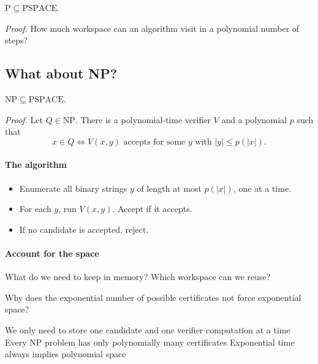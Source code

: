 \documentclass[11  pt]{article}
\begin{document}
\begin{theorem}
    $\mathrm{P}\subseteq\mathrm{PSPACE}$.
\end{theorem}
\textit{Proof.} How much workspace can an algorithm visit in a polynomial number of steps?
\vs{1.5cm}

\newpage
\subsection*{What about NP?}
\begin{theorem}
    $\mathrm{NP}\subseteq\mathrm{PSPACE}$.
\end{theorem}

\textit{Proof.} Let $Q\in\mathrm{NP}$. There is a polynomial-time verifier $V$ and a polynomial $p$ such that
\begin{equation*}
    x\in Q \iff V(x,y)\text{ accepts for some }y\text{ with }|y|\leq p(|x|).
\end{equation*}

\paragraph{The algorithm}
\begin{itemize}
    \item Enumerate all binary strings $y$ of length at most $p(|x|)$, one at a time.
    \item For each $y$, run $V(x,y)$. Accept if it accepts.
    \item If no candidate is accepted, reject.
\end{itemize}

\paragraph{Account for the space}
What do we need to keep in memory? Which workspace can we reuse?
\vs{2cm}

\begin{Qu}
    Why does the exponential number of possible certificates not force exponential space?
    \begin{itemize}
        \aitem We only need to store one candidate and one verifier computation at a time
        \bitem Every NP problem has only polynomially many certificates
        \citem Exponential time always implies polynomial space
    \end{itemize}
\end{Qu}
\end{document}
